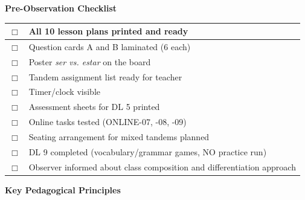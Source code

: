\documentclass[11pt, a4paper]{article}
\newcommand{\es}[1]{\textcolor{spanisch}{\textit{#1}}}
\begin{document}
\vspace{0.5cm}


{\large\bfseries\color{spanisch} Pre-Observation Checklist}

\vspace{0.3cm}

\begin{tabular}{|p{0.5cm}|p{14cm}|}
\hline
$\Box$ & All 10 lesson plans printed and ready \\
\hline
$\Box$ & Question cards A and B laminated (6 each) \\
\hline
$\Box$ & Poster \es{ser vs. estar} on the board \\
\hline
$\Box$ & Tandem assignment list ready for teacher \\
\hline
$\Box$ & Timer/clock visible \\
\hline
$\Box$ & Assessment sheets for DL 5 printed \\
\hline
$\Box$ & Online tasks tested (ONLINE-07, -08, -09) \\
\hline
$\Box$ & Seating arrangement for mixed tandems planned \\
\hline
$\Box$ & DL 9 completed (vocabulary/grammar games, NO practice run) \\
\hline
$\Box$ & Observer informed about class composition and differentiation approach \\
\hline
\end{tabular}

\vspace{0.5cm}


{\large\bfseries\color{spanisch} Key Pedagogical Principles}

\vspace{0.3cm}
\end{document}
